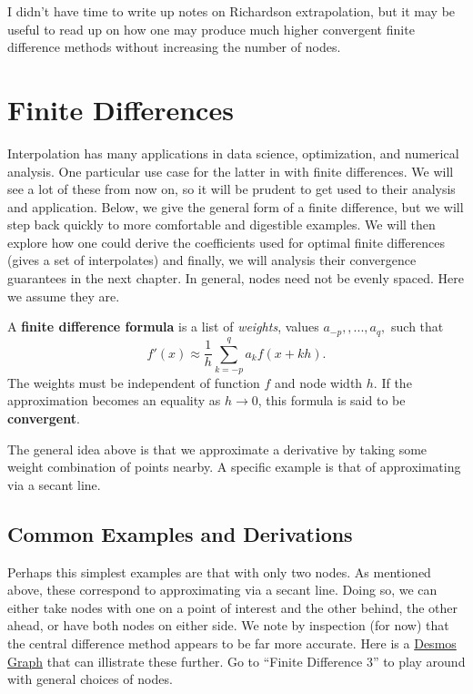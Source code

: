 \documentclass[11pt]{article}
\begin{document}
\begin{remark}
    I didn't have time to write up notes on Richardson extrapolation, but it may be useful to read up on how one may produce much higher convergent finite difference methods without increasing the number of nodes. 
\end{remark}
 
\newpage

\section{Finite Differences}

Interpolation has many applications in data science, optimization, and numerical analysis. One particular use case for the latter in with finite differences. We will see a lot of these from now on, so it will be prudent to get used to their analysis and application. Below, we give the general form of a finite difference, but we will step back quickly to more comfortable and digestible examples. We will then explore how one could derive the coefficients used for optimal finite differences (gives a set of interpolates) and finally, we will analysis their convergence guarantees in the next chapter. In general, nodes need not be evenly spaced. Here we assume they are.
\begin{definition}
    A \textbf{finite difference formula} is a list of \textit{weights}, values $a_{-p},, ..., a_q,$ such that $$f'(x) \approx \frac{1}{h}\sum_{k=-p}^q a_kf(x+kh).$$ The weights must be independent of function $f$ and node width $h$. If the approximation becomes an equality as $h \to 0$, this formula is said to be \textbf{convergent}.
\end{definition}

The general idea above is that we approximate a derivative by taking some weight combination of points nearby. A specific example is that of approximating via a secant line. 

\subsection{Common Examples and Derivations}

Perhaps this simplest examples are that with only two nodes. As mentioned above, these correspond to approximating via a secant line. Doing so, we can either take nodes with one on a point of interest and the other behind, the other ahead, or have both nodes on either side. We note by inspection (for now) that the central difference method appears to be far more accurate. Here is a {\color{blue}\href{https://www.desmos.com/calculator/9qttjfsxve}{Desmos Graph}} that can illistrate these further. Go to ``Finite Difference 3'' to play around with general choices of nodes.
\end{document}
